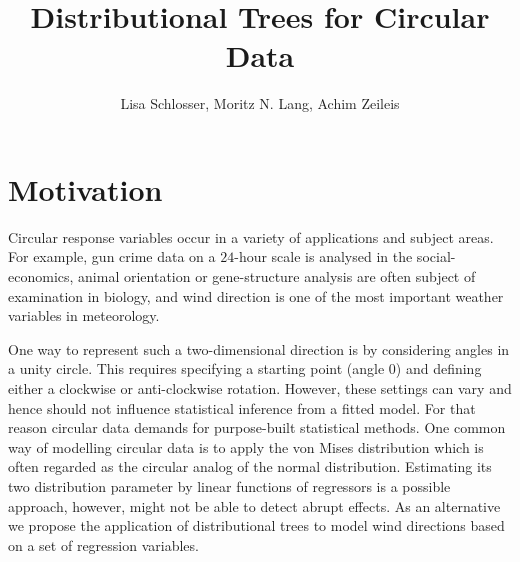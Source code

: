 \documentclass[twoside]{report}
\begin{document}

\title{Distributional Trees for Circular Data}

\author{Lisa Schlosser, Moritz N. Lang, Achim Zeileis}





\maketitle



\section{Motivation}
Circular response variables occur in a variety of applications and subject areas. 
For example, gun crime data on a $24$-hour scale is analysed in the social-economics, 
animal orientation or gene-structure analysis are often subject of examination in biology, 
and wind direction is one of the most important weather variables in meteorology.

One way to represent such a two-dimensional direction is by considering angles in a
unity circle. This requires specifying a starting point (angle 0) and defining
either a clockwise or anti-clockwise rotation. However, these settings can vary
and hence should not influence statistical inference from a fitted model.
For that reason circular data demands for purpose-built statistical methods. 
One common way of modelling circular data is to apply the von Mises distribution 
which is often regarded as the circular analog of the normal distribution. 
Estimating its two distribution parameter by linear functions of regressors is
a possible approach, however, might not be able to detect abrupt effects.
As an alternative  we propose the application of distributional trees to
model wind directions based on a set of regression variables.
\end{document}
